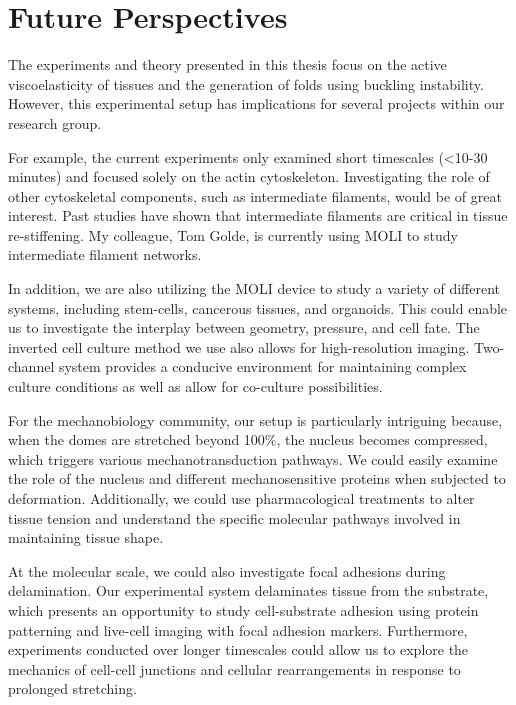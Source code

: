 \hypertarget{future-perspectives}{%
	\section{Future Perspectives}\label{future-perspectives}}

The experiments and theory presented in this thesis focus on the active
viscoelasticity of tissues and the generation of folds using buckling
instability. However, this experimental setup has implications for
several projects within our research group.

For example, the current experiments only examined short timescales
(\textless10-30 minutes) and focused solely on the actin cytoskeleton.
Investigating the role of other cytoskeletal components, such as
intermediate filaments, would be of great interest. Past studies have
shown that intermediate filaments are critical in tissue re-stiffening.
My colleague, Tom Golde, is currently using MOLI to study intermediate
filament networks.

In addition, we are also utilizing the MOLI device to study a variety of
different systems, including stem-cells, cancerous tissues, and
organoids. This could enable us to investigate the interplay between
geometry, pressure, and cell fate. The inverted cell culture method we
use also allows for high-resolution imaging. Two-channel system provides
a conducive environment for maintaining complex culture conditions as
well as allow for co-culture possibilities.

For the mechanobiology community, our setup is particularly intriguing
because, when the domes are stretched beyond 100\%, the nucleus becomes
compressed, which triggers various mechanotransduction pathways. We
could easily examine the role of the nucleus and different
mechanosensitive proteins when subjected to deformation. Additionally,
we could use pharmacological treatments to alter tissue tension and
understand the specific molecular pathways involved in maintaining
tissue shape.

At the molecular scale, we could also investigate focal adhesions during
delamination. Our experimental system delaminates tissue from the
substrate, which presents an opportunity to study cell-substrate
adhesion using protein patterning and live-cell imaging with focal
adhesion markers. Furthermore, experiments conducted over longer
timescales could allow us to explore the mechanics of cell-cell
junctions and cellular rearrangements in response to prolonged
stretching.

